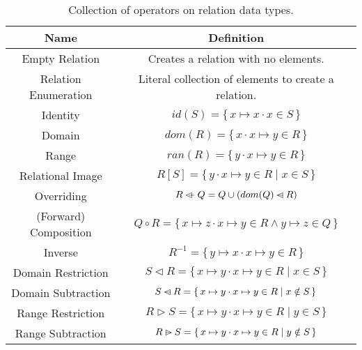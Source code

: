 \documentclass{article}
\newcommand{\Set}[2]{%
  \{\, #1 \mid #2 \, \}%
}
\newcommand{\bSet}[3]{%
  \{\, #1 \cdot #2 \mid #3 \, \}%
}
\newcommand{\bSetT}[2]{%
  \{\, #1 \cdot #2 \,\}%
}
\begin{document}
\begin{table}[H]
    \centering
    \caption{Collection of operators on relation data types.}
    \begin{tabular}{|c|c|}
        \hline
        Name & Definition \\ %
        \hline
        Empty Relation & Creates a relation with no elements.\\ %
        Relation Enumeration & Literal collection of elements to create a relation.\\ %
        Identity & $id(S)= \bSetT{x \mapsto x}{x \in S}$\\ %
        Domain & $dom(R) = \bSetT{x}{x \mapsto y \in R}$\\ %
        Range & $ran(R) = \bSetT{y}{x \mapsto y \in R}$\\ %
        \hline
        Relational Image & $R[S] = \bSet{y}{x \mapsto y \in R}{x \in S}$ \\ %
        Overriding & $R \mathbin{\lhd\mkern-9mu-} Q = Q \cup (dom(Q) \mathbin{\lhd\mkern-14mu-} R)$\\ %
        (Forward) Composition & $Q \circ R = \bSetT{x \mapsto z}{x \mapsto y \in R \land y \mapsto z \in Q}$\\ %
        Inverse & $R^{-1} = \bSetT{y \mapsto x}{x \mapsto y \in R}$ \\ %
        \hline
        Domain Restriction & $S \triangleleft R = \bSet{x \mapsto y}{x \mapsto y \in R}{x \in S}$\\ %
        Domain Subtraction & $S \domsub R = \bSet{x \mapsto y}{x \mapsto y \in R}{x \notin S}$\\ %
        Range Restriction & $R \triangleright S = \bSet{x \mapsto y}{x \mapsto y \in R}{y \in S}$\\ %
        Range Subtraction & $R \ransub S = \bSet{x \mapsto y}{x \mapsto y \in R}{y \notin S}$\\ %
        \hline
    \end{tabular}
    \label{tab:relOps}
\end{table}
\end{document}
